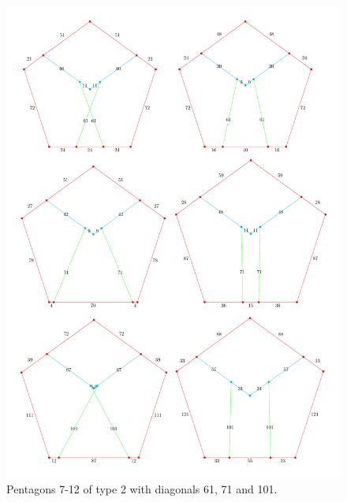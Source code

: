 \documentclass[11pt]{article}
\begin{document}
\begin{figure}
\centering
\includegraphics[width=16cm]{types/2gen-b}
\caption{Pentagons 7-12 of type 2 with diagonals 61, 71 and 101.}
\label{2gen-a}
\end{figure}
\end{document}

